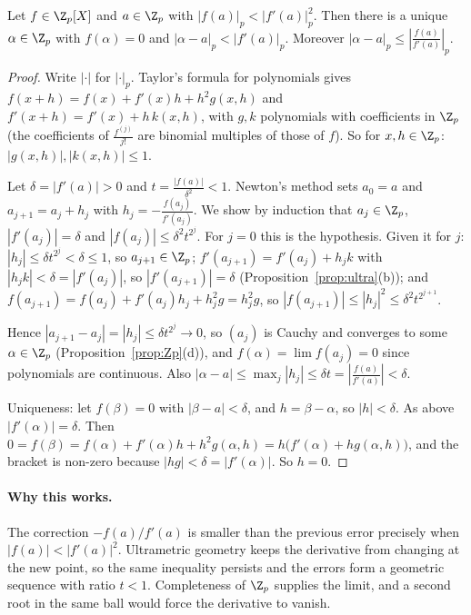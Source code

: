 \begin{theorem}\label{thm:henselnewton}
Let $f\in\Z_p[X]$ and $a\in\Z_p$ with $|f(a)|_p<|f'(a)|_p^2$. Then there is a unique $\alpha\in\Z_p$ with $f(\alpha)=0$ and $|\alpha-a|_p<|f'(a)|_p$. Moreover $|\alpha-a|_p\le\left|\frac{f(a)}{f'(a)}\right|_p$.
\end{theorem}
\begin{proof}
Write $|\cdot|$ for $|\cdot|_p$. Taylor's formula for polynomials gives $f(x+h)=f(x)+f'(x)h+h^2g(x,h)$ and $f'(x+h)=f'(x)+h\,k(x,h)$, with $g,k$ polynomials with coefficients in $\Z_p$ (the coefficients of $\frac{f^{(j)}}{j!}$ are binomial multiples of those of $f$). So for $x,h\in\Z_p$: $|g(x,h)|,|k(x,h)|\le1$.

Let $\delta=|f'(a)|>0$ and $t=\frac{|f(a)|}{\delta^2}<1$. Newton's method sets $a_0=a$ and $a_{j+1}=a_j+h_j$ with $h_j=-\frac{f(a_j)}{f'(a_j)}$. We show by induction that $a_j\in\Z_p$, $|f'(a_j)|=\delta$ and $|f(a_j)|\le\delta^2t^{2^j}$. For $j=0$ this is the hypothesis. Given it for $j$: $|h_j|\le\delta t^{2^j}<\delta\le1$, so $a_{j+1}\in\Z_p$; $f'(a_{j+1})=f'(a_j)+h_jk$ with $|h_jk|<\delta=|f'(a_j)|$, so $|f'(a_{j+1})|=\delta$ (Proposition~\ref{prop:ultra}(b)); and $f(a_{j+1})=f(a_j)+f'(a_j)h_j+h_j^2g=h_j^2g$, so $|f(a_{j+1})|\le|h_j|^2\le\delta^2t^{2^{j+1}}$.

Hence $|a_{j+1}-a_j|=|h_j|\le\delta t^{2^j}\to0$, so $(a_j)$ is Cauchy and converges to some $\alpha\in\Z_p$ (Proposition~\ref{prop:Zp}(d)), and $f(\alpha)=\lim f(a_j)=0$ since polynomials are continuous. Also $|\alpha-a|\le\max_j|h_j|\le\delta t=\left|\frac{f(a)}{f'(a)}\right|<\delta$.

Uniqueness: let $f(\beta)=0$ with $|\beta-a|<\delta$, and $h=\beta-\alpha$, so $|h|<\delta$. As above $|f'(\alpha)|=\delta$. Then $0=f(\beta)=f(\alpha)+f'(\alpha)h+h^2g(\alpha,h)=h\big(f'(\alpha)+hg(\alpha,h)\big)$, and the bracket is non-zero because $|hg|<\delta=|f'(\alpha)|$. So $h=0$.
\end{proof}

\paragraph{Why this works.}
The correction $-f(a)/f'(a)$ is smaller than the previous error precisely when $|f(a)|<|f'(a)|^2$. Ultrametric geometry keeps the derivative from changing at the new point, so the same inequality persists and the errors form a geometric sequence with ratio $t<1$. Completeness of $\Z_p$ supplies the limit, and a second root in the same ball would force the derivative to vanish.

